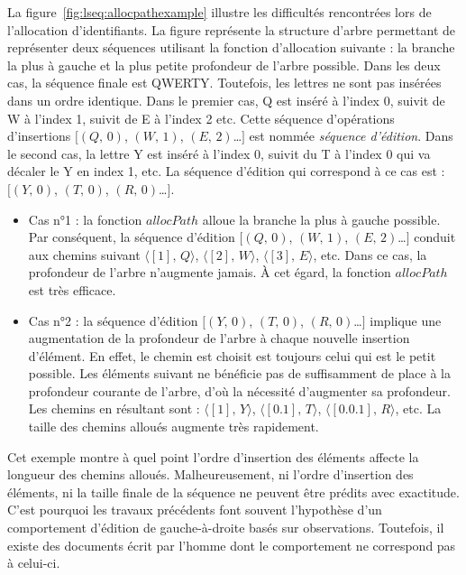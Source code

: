 La figure~\ref{fig:lseq:allocpathexample} illustre les difficultés rencontrées lors
de l'allocation d'identifiants. La figure représente la structure d'arbre
permettant de représenter deux séquences utilisant la fonction d'allocation
suivante : la branche la plus à gauche et la plus petite profondeur de l'arbre
possible. Dans les deux cas, la séquence finale est QWERTY. Toutefois, les
lettres ne sont pas insérées dans un ordre identique. Dans le premier cas, Q est
inséré à l'index 0, suivit de W à l'index 1, suivit de E à l'index 2 etc. Cette
séquence d'opérations d'insertions $[(Q,\,0)$, $(W,\,1)$, $(E,\,2)$\ldots$]$ est
nommée \emph{séquence d'édition}. Dans le second cas, la lettre Y est inséré à
l'index 0, suivit du T à l'index 0 qui va décaler le Y en index 1, etc. La
séquence d'édition qui correspond à ce cas est : $[(Y,\,0)$, $(T,\,0)$,
$(R,\,0)$\ldots$]$.
\begin{itemize}
\item Cas n°1 : la fonction $allocPath$ alloue la branche la plus à gauche
  possible. Par conséquent, la séquence d'édition $[(Q,\,0)$, $(W,\,1)$,
  $(E,\,2)$\ldots$]$ conduit aux chemins suivant $\langle [1],\,Q\rangle$,
  $\langle [2],\, W \rangle$, $\langle [3],\, E\rangle$, etc. Dans ce cas, la
  profondeur de l'arbre n'augmente jamais. À cet égard, la fonction $allocPath$
  est très efficace.
\item Cas n°2 : la séquence d'édition $[(Y,\,0)$, $(T,\,0)$, $(R,\,0)$\ldots$]$
  implique une augmentation de la profondeur de l'arbre à chaque nouvelle
  insertion d'élément. En effet, le chemin est choisit est toujours celui qui
  est le petit possible. Les éléments suivant ne bénéficie pas de suffisamment de
  place à la profondeur courante de l'arbre, d'où la nécessité d'augmenter sa
  profondeur. Les chemins en résultant sont : $\langle [1],\, Y\rangle$,
  $\langle[0.1],\,T\rangle$, $\langle[0.0.1],\, R\rangle$, etc. La taille des
  chemins alloués augmente très rapidement.
\end{itemize}

Cet exemple montre à quel point l'ordre d'insertion des éléments affecte la
longueur des chemins alloués. Malheureusement, ni l'ordre d'insertion des
éléments, ni la taille finale de la séquence ne peuvent être prédits avec
exactitude. C'est pourquoi les travaux précédents font souvent l'hypothèse d'un
comportement d'édition de gauche-à-droite basés sur observations. Toutefois, il
existe des documents écrit par l'homme dont le comportement ne correspond pas à
celui-ci.


